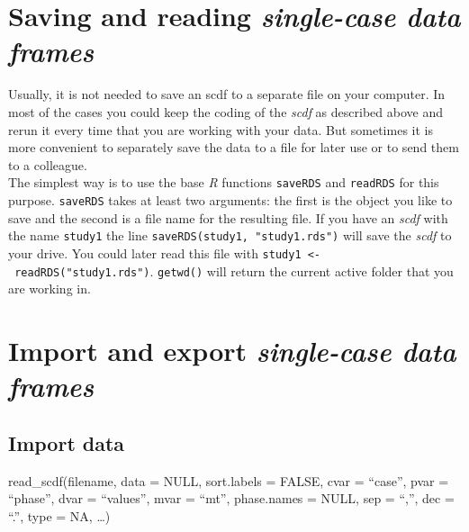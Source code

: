 \documentclass[
  letterpaper,
  DIV=11,
  numbers=noendperiod]{scrreprt}
\begin{document}
\hypertarget{saving-and-reading-single-case-data-frames}{%
\section{\texorpdfstring{Saving and reading \emph{single-case data
frames}}{Saving and reading single-case data frames}}\label{saving-and-reading-single-case-data-frames}}

Usually, it is not needed to save an scdf to a separate file on your
computer. In most of the cases you could keep the coding of the
\emph{scdf} as described above and rerun it every time that you are
working with your data. But sometimes it is more convenient to
separately save the data to a file for later use or to send them to a
colleague.\\
The simplest way is to use the base \emph{R} functions \texttt{saveRDS}
and \texttt{readRDS} for this purpose. \texttt{saveRDS} takes at least
two arguments: the first is the object you like to save and the second
is a file name for the resulting file. If you have an \emph{scdf} with
the name \texttt{study1} the line
\texttt{saveRDS(study1,\ "study1.rds")} will save the \emph{scdf} to
your drive. You could later read this file with
\texttt{study1\ \textless{}-\ readRDS("study1.rds")}. \texttt{getwd()}
will return the current active folder that you are working in.

\hypertarget{import-and-export-single-case-data-frames}{%
\section{\texorpdfstring{Import and export \emph{single-case data
frames}}{Import and export single-case data frames}}\label{import-and-export-single-case-data-frames}}

\hypertarget{sec-read-scdf}{%
\subsection{Import data}\label{sec-read-scdf}}

\begin{tcolorbox}[enhanced jigsaw, toprule=.15mm, colframe=quarto-callout-tip-color-frame, left=2mm, colback=white, breakable, bottomrule=.15mm, arc=.35mm, rightrule=.15mm, leftrule=.75mm, opacityback=0]
\begin{minipage}[t]{5.5mm}
\textcolor{quarto-callout-tip-color}{\faLightbulb}
\end{minipage}%
\begin{minipage}[t]{\textwidth - 5.5mm}
read\_scdf(filename, data = NULL, sort.labels = FALSE, cvar = ``case'',
pvar = ``phase'', dvar = ``values'', mvar = ``mt'', phase.names = NULL,
sep = ``,'', dec = ``.'', type = NA, \ldots)\end{minipage}%
\end{tcolorbox}
\end{document}
